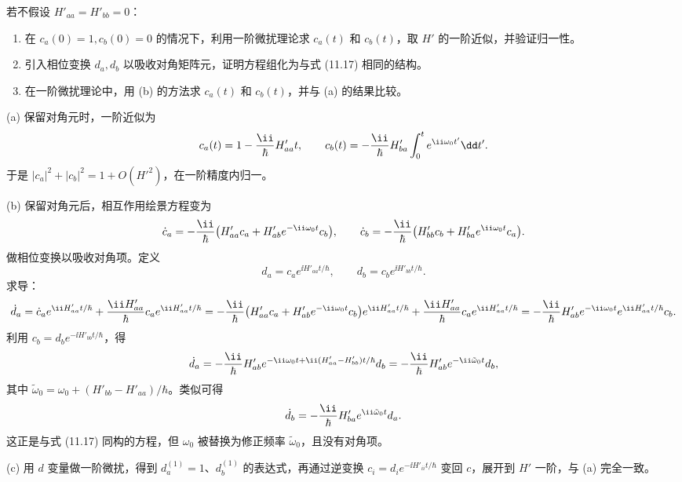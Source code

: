 \begin{question}
若不假设 $H'_{aa}=H'_{bb}=0$：
\begin{enumerate}
\item 在 $c_a(0)=1,c_b(0)=0$ 的情况下，利用一阶微扰理论求 $c_a(t)$ 和 $c_b(t)$，取 $H'$ 的一阶近似，并验证归一性。
\item 引入相位变换 $d_a,d_b$ 以吸收对角矩阵元，证明方程组化为与式 (11.17) 相同的结构。
\item 在一阶微扰理论中，用 (b) 的方法求 $c_a(t)$ 和 $c_b(t)$，并与 (a) 的结果比较。
\end{enumerate}

\par\smallskip
{}

\end{question}
\begin{solution}
(a) 保留对角元时，一阶近似为
\[
c_a(t)=1-{\ii\over\hbar}H'_{aa}t,
\qquad
c_b(t)=-{\ii\over\hbar}H'_{ba}\int_0^t e^{\ii\omega_0t'}\dd t'.
\]
于是 $|c_a|^2+|c_b|^2=1+O(H'^2)$，在一阶精度内归一。

(b) 保留对角元后，相互作用绘景方程变为
\[
\dot c_a=-{\ii\over\hbar}\big(H'_{aa}c_a+H'_{ab}e^{-\ii\omega_0t}c_b\big),\qquad
\dot c_b=-{\ii\over\hbar}\big(H'_{bb}c_b+H'_{ba}e^{\ii\omega_0t}c_a\big).
\]
做相位变换以吸收对角项。定义
\[
d_a=c_a e^{\ii H'_{aa}t/\hbar},\qquad
d_b=c_b e^{\ii H'_{bb}t/\hbar}.
\]
求导：
\[
\dot d_a=\dot c_a e^{\ii H'_{aa}t/\hbar}+{\ii H'_{aa}\over\hbar}c_a e^{\ii H'_{aa}t/\hbar}
=-{\ii\over\hbar}\big(H'_{aa}c_a+H'_{ab}e^{-\ii\omega_0t}c_b\big)e^{\ii H'_{aa}t/\hbar}
+{\ii H'_{aa}\over\hbar}c_a e^{\ii H'_{aa}t/\hbar}
=-{\ii\over\hbar}H'_{ab}e^{-\ii\omega_0t}e^{\ii H'_{aa}t/\hbar}c_b.
\]
利用 $c_b=d_b e^{-\ii H'_{bb}t/\hbar}$，得
\[
\dot d_a=-{\ii\over\hbar}H'_{ab}e^{-\ii\omega_0t+\ii(H'_{aa}-H'_{bb})t/\hbar}d_b
=-{\ii\over\hbar}H'_{ab}e^{-\ii\tilde\omega_0 t}d_b,
\]
其中 $\tilde\omega_0=\omega_0+(H'_{bb}-H'_{aa})/\hbar$。类似可得
\[
\dot d_b=-{\ii\over\hbar}H'_{ba}e^{\ii\tilde\omega_0 t}d_a.
\]
这正是与式 (11.17) 同构的方程，但 $\omega_0$ 被替换为修正频率 $\tilde\omega_0$，且没有对角项。

(c) 用 $d$ 变量做一阶微扰，得到 $d_a^{(1)}=1$、$d_b^{(1)}$ 的表达式，再通过逆变换 $c_i=d_i e^{-\ii H'_{ii}t/\hbar}$ 变回 $c$，展开到 $H'$ 一阶，与 (a) 完全一致。
\end{solution}

